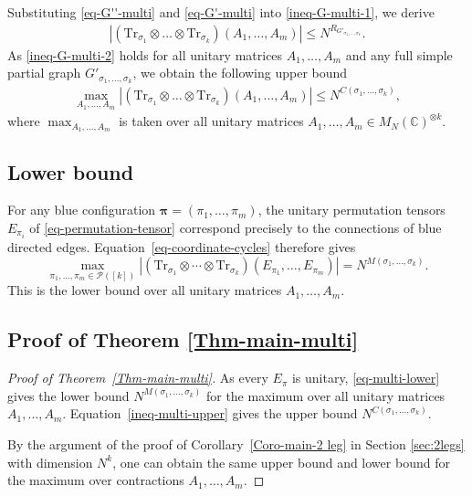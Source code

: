 \documentclass[12pt]{article}
\numberwithin{equation}{section}
\theoremstyle{plain}
\def\bC{\mathbb C}
\def\cP{\mathcal P}
\def\Tr{\mathrm {Tr}}
\begin{document}
Substituting \eqref{eq-G''-multi} and \eqref{eq-G'-multi} into \eqref{ineq-G-multi-1}, we derive
\begin{align} \label{ineq-G-multi-2}
    \left| \left( \Tr_{\sigma_1} \otimes \ldots \otimes \Tr_{\sigma_k} \right) \left( A_1, \ldots, A_m \right) \right|
    \le N^{R_{G'_{\sigma_1,\ldots,\sigma_k}}}.
\end{align}
As \eqref{ineq-G-multi-2} holds for all unitary matrices $A_1,\ldots,A_m$ and any full simple partial graph $G'_{\sigma_1,\ldots,\sigma_k}$, we obtain the following upper bound
\begin{align} \label{ineq-multi-upper}
    \max_{A_1,\ldots,A_m} \left| \left( \Tr_{\sigma_1} \otimes \ldots \otimes \Tr_{\sigma_k} \right) \left( A_1, \ldots, A_m \right) \right|
    \le N^{C(\sigma_1,\ldots,\sigma_k)},
\end{align}
where $\max_{A_1,\ldots,A_m}$ is taken over all unitary matrices $A_1,\ldots,A_m \in M_N (\bC)^{\otimes k}$.

\subsection{Lower bound}

For any blue configuration $\boldsymbol\pi=(\pi_1,\ldots,\pi_m)$, the unitary permutation tensors $E_{\pi_i}$ of \eqref{eq-permutation-tensor} correspond precisely to the connections of blue directed edges. Equation~\eqref{eq-coordinate-cycles} therefore gives
\begin{equation}\label{eq-multi-lower}
\max_{\pi_1,\ldots,\pi_m\in\cP([k])}
\left|(\Tr_{\sigma_1}\otimes\cdots\otimes\Tr_{\sigma_k})(E_{\pi_1},\ldots,E_{\pi_m})\right|
=N^{M(\sigma_1,\ldots,\sigma_k)}.
\end{equation}
This is the lower bound over all unitary matrices $A_1,\ldots,A_m$.

\subsection{Proof of Theorem \ref{Thm-main-multi}}

\begin{proof}[Proof of Theorem~\ref{Thm-main-multi}]
As every $E_\pi$ is unitary, \eqref{eq-multi-lower} gives the lower bound $N^{M(\sigma_1,\ldots,\sigma_k)}$ for the maximum over all unitary matrices $A_1,\ldots,A_m$. Equation~\eqref{ineq-multi-upper} gives the upper bound $N^{C(\sigma_1,\ldots,\sigma_k)}$.

By the argument of the proof of Corollary~\ref{Coro-main-2 leg} in Section \ref{sec:2legs} with dimension $N^k$, one can obtain the same upper bound and lower bound for the maximum over contractions $A_1,\ldots,A_m$.
\end{proof}
\end{document}
